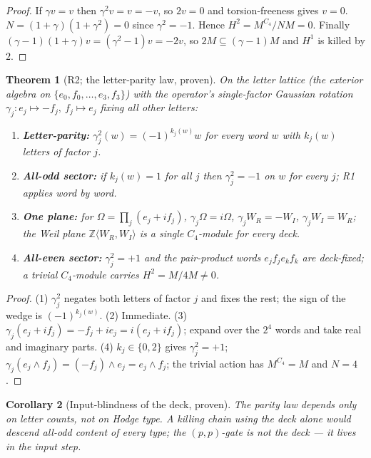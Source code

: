 \documentclass[11pt]{article}
\newcommand{\Z}{\mathbb Z}
\newtheorem{theorem}{Theorem}[section]
\newtheorem{corollary}[theorem]{Corollary}
\begin{document}
\begin{proof}
If $\gamma v=v$ then $\gamma^2v=v=-v$, so $2v=0$ and torsion-freeness gives
$v=0$. $N=(1+\gamma)(1+\gamma^2)=0$ since $\gamma^2=-1$. Hence
$H^2=M^{C_4}/NM=0$. Finally $(\gamma-1)(1+\gamma)v=(\gamma^2-1)v=-2v$, so
$2M\subseteq(\gamma-1)M$ and $H^1$ is killed by $2$.
\end{proof}

\begin{theorem}[R2; the letter-parity law, proven]\label{thm:R2}
On the letter lattice (the exterior algebra on
$\{e_0,f_0,\dots,e_3,f_3\}$) with the operator's single-factor Gaussian
rotation $\gamma_j\colon e_j\mapsto-f_j,\ f_j\mapsto e_j$ fixing all other
letters:
\begin{enumerate}
\item \textbf{Letter-parity:} $\gamma_j^2(w)=(-1)^{k_j(w)}w$ for every word
$w$ with $k_j(w)$ letters of factor $j$.
\item \textbf{All-odd sector:} if $k_j(w)=1$ for all $j$ then $\gamma_j^2=-1$
on $w$ for every $j$; R1 applies word by word.
\item \textbf{One plane:} for $\Omega=\prod_j(e_j+if_j)$,
$\gamma_j\Omega=i\Omega$, $\gamma_jW_R=-W_I$, $\gamma_jW_I=W_R$; the Weil
plane $\Z\langle W_R,W_I\rangle$ is a single $C_4$-module for every deck.
\item \textbf{All-even sector:} $\gamma_j^2=+1$ and the pair-product words
$e_jf_je_kf_k$ are deck-fixed; a trivial $C_4$-module carries
$H^2=M/4M\neq0$.
\end{enumerate}
\end{theorem}

\begin{proof}
(1) $\gamma_j^2$ negates both letters of factor $j$ and fixes the rest; the
sign of the wedge is $(-1)^{k_j(w)}$. (2) Immediate. (3)
$\gamma_j(e_j+if_j)=-f_j+ie_j=i(e_j+if_j)$; expand over the $2^4$ words and
take real and imaginary parts. (4) $k_j\in\{0,2\}$ gives $\gamma_j^2=+1$;
$\gamma_j(e_j\wedge f_j)=(-f_j)\wedge e_j=e_j\wedge f_j$; the trivial
action has $M^{C_4}=M$ and $N=4$.
\end{proof}

\begin{corollary}[Input-blindness of the deck, proven]
The parity law depends only on letter counts, not on Hodge type. A killing
chain using the deck alone would descend all-odd content of every type; the
$(p,p)$-gate is not the deck --- it lives in the input step.
\end{corollary}
\end{document}
